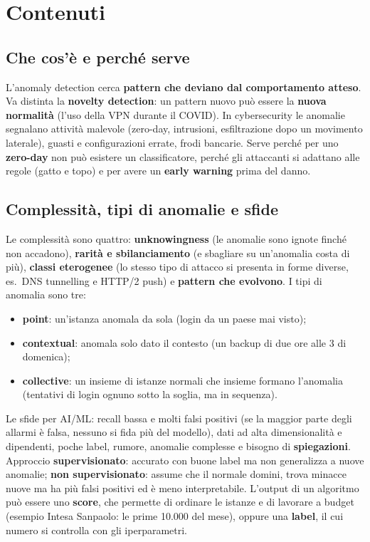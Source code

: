 \section{Contenuti}

\subsection{Che cos'è e perché serve}
L'anomaly detection cerca \textbf{pattern che deviano dal comportamento atteso}. Va distinta la
\textbf{novelty detection}: un pattern nuovo può essere la \textbf{nuova normalità} (l'uso della VPN
durante il COVID). In cybersecurity le anomalie segnalano attività malevole (zero-day, intrusioni,
esfiltrazione dopo un movimento laterale), guasti e configurazioni errate, frodi bancarie. Serve perché
per uno \textbf{zero-day} non può esistere un classificatore, perché gli attaccanti si adattano alle
regole (gatto e topo) e per avere un \textbf{early warning} prima del danno.

\subsection{Complessità, tipi di anomalie e sfide}
Le complessità sono quattro: \textbf{unknowingness} (le anomalie sono ignote finché non accadono),
\textbf{rarità e sbilanciamento} (e sbagliare su un'anomalia costa di più), \textbf{classi eterogenee}
(lo stesso tipo di attacco si presenta in forme diverse, es.\ DNS tunnelling e HTTP/2 push) e
\textbf{pattern che evolvono}. I tipi di anomalia sono tre:
\begin{itemize}
  \item \textbf{point}: un'istanza anomala da sola (login da un paese mai visto);
  \item \textbf{contextual}: anomala solo dato il contesto (un backup di due ore alle 3 di domenica);
  \item \textbf{collective}: un insieme di istanze normali che insieme formano l'anomalia (tentativi di
    login ognuno sotto la soglia, ma in sequenza).
\end{itemize}
Le sfide per AI/ML: recall bassa e molti falsi positivi (se la maggior parte degli allarmi è falsa,
nessuno si fida più del modello), dati ad alta dimensionalità e dipendenti, poche label, rumore, anomalie
complesse e bisogno di \textbf{spiegazioni}. Approccio \textbf{supervisionato}: accurato con buone label
ma non generalizza a nuove anomalie; \textbf{non supervisionato}: assume che il normale domini, trova
minacce nuove ma ha più falsi positivi ed è meno interpretabile. L'output di un algoritmo può essere uno
\textbf{score}, che permette di ordinare le istanze e di lavorare a budget (esempio Intesa Sanpaolo:
le prime 10.000 del mese), oppure una \textbf{label}, il cui numero si controlla con gli iperparametri.

